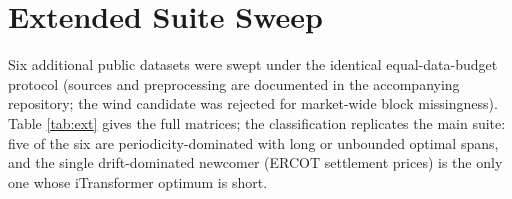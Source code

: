 \section{Extended Suite Sweep}
\label{app:ext}

Six additional public datasets were swept under the identical equal-data-budget protocol (sources and preprocessing are documented in the accompanying repository; the wind candidate was rejected for market-wide block missingness). Table \ref{tab:ext} gives the full matrices; the classification replicates the main suite: five of the six are periodicity-dominated with long or unbounded optimal spans, and the single drift-dominated newcomer (ERCOT settlement prices) is the only one whose iTransformer optimum is short.

\begin{table}[h]
\caption{Equal-budget lookback sweep on the six extension datasets (test MSE, mean $\pm$ std over seeds 2021--2023; bold = best lookback of the row).}
\label{tab:ext}
\centering\footnotesize
{}
\end{table}
